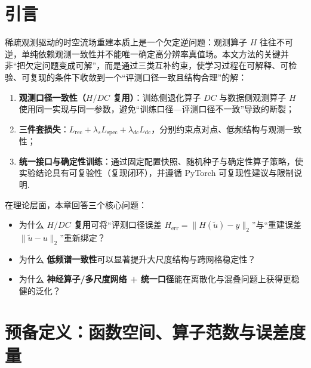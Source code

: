 
\setcounter{section}{-1}

\section{引言}\label{sec:theory_intro}

稀疏观测驱动的时空流场重建本质上是一个欠定逆问题：观测算子 $H$ 往往不可逆，单纯依赖观测一致性并不能唯一确定高分辨率真值场。本文方法的关键并非“把欠定问题变成可解”，而是通过三类互补约束，使学习过程在可解释、可检验、可复现的条件下收敛到一个“评测口径一致且结构合理”的解：
\begin{enumerate}[label=(\arabic*)]
  \item \textbf{观测口径一致性（$H/DC$ 复用）}：训练侧退化算子 $DC$ 与数据侧观测算子 $H$ 使用同一实现与同一参数，避免“训练口径—评测口径不一致”导致的断裂；
  \item \textbf{三件套损失}：$L_{\text{rec}} + \lambda_s L_{\text{spec}} + \lambda_{dc} L_{\text{dc}}$，分别约束点对点、低频结构与观测一致性；
  \item \textbf{统一接口与确定性训练}：通过固定配置快照、随机种子与确定性算子策略，使实验结论具有可复验性（复现闭环），并遵循 PyTorch 可复现性建议与限制说明\cite{pytorch_randomness}.
\end{enumerate}

在理论层面，本章回答三个核心问题：
\begin{itemize}
  \item 为什么 \textbf{$H/DC$ 复用}可将“评测口径误差 $H_{\text{err}}=\|H(\tilde u)-y\|_2$”与“重建误差 $\|\tilde u-u\|_2$”重新绑定？
  \item 为什么 \textbf{低频谱一致性}可以显著提升大尺度结构与跨网格稳定性？
  \item 为什么 \textbf{神经算子/多尺度网络 + 统一口径}能在离散化与混叠问题上获得更稳健的泛化？
\end{itemize}

\section{预备定义：函数空间、算子范数与误差度量}\label{sec:prelim}

